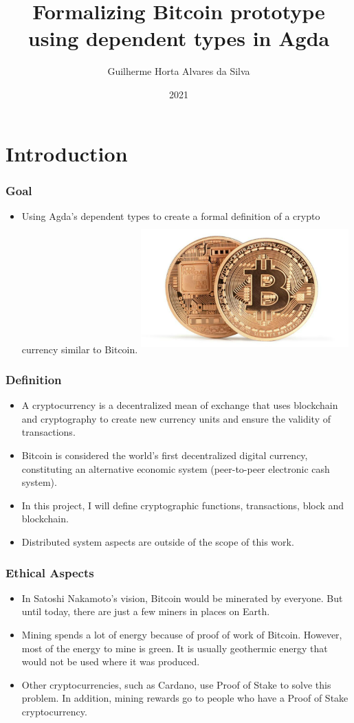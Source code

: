 \documentclass{beamer}
\title{Formalizing Bitcoin prototype \\
  using dependent types in Agda }
\author[Guilherme]{Guilherme Horta Alvares da Silva}
\date{2021}
\begin{document}
\frame{\titlepage}

\section{Introduction}

\begin{frame}
\frametitle{Goal}
\begin{itemize}
  \item Using Agda's dependent types to create a formal definition of a crypto currency similar to Bitcoin.
    \includegraphics[width=8cm, height=5cm]{TwoBitcoins}
\end{itemize}
\end{frame}

\begin{frame}
   \frametitle{Definition}
\begin{itemize}
     \item A cryptocurrency is a decentralized mean of exchange that uses
       blockchain and cryptography to create new currency units and ensure the validity of transactions.
     \item Bitcoin is considered the world's first decentralized digital currency,
       constituting an alternative economic system (peer-to-peer electronic cash system).
     \item In this project, I will define cryptographic functions, transactions, block and blockchain.
     \item Distributed system aspects are outside of the scope of this work.
     \end{itemize}
\end{frame}

\begin{frame}
   \frametitle{Ethical Aspects}
\begin{itemize}
  \item In Satoshi Nakamoto's vision, Bitcoin would be minerated by everyone.
    But until today, there are just a few miners in places on Earth.
  \item Mining spends a lot of energy because of proof of work of Bitcoin.
    However, most of the energy to mine is green. It is usually geothermic energy that would not be used where it was produced.
  \item Other cryptocurrencies, such as Cardano, use Proof of Stake to solve this problem. In addition, mining rewards go to people who have a Proof of Stake cryptocurrency.
\end{itemize}
\end{frame}
\end{document}
